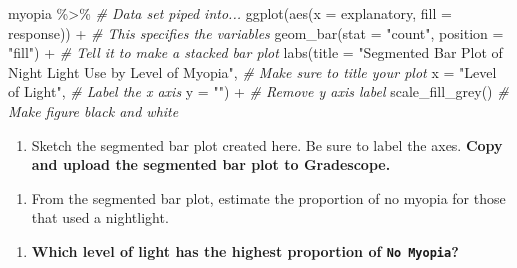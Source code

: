 \documentclass[
]{report}
\newenvironment{Shaded}{\begin{snugshade}}{\end{snugshade}}
\newcommand{\AttributeTok}[1]{\textcolor[rgb]{0.77,0.63,0.00}{#1}}
\newcommand{\CommentTok}[1]{\textcolor[rgb]{0.56,0.35,0.01}{\textit{#1}}}
\newcommand{\FunctionTok}[1]{\textcolor[rgb]{0.00,0.00,0.00}{#1}}
\newcommand{\NormalTok}[1]{#1}
\newcommand{\SpecialCharTok}[1]{\textcolor[rgb]{0.00,0.00,0.00}{#1}}
\newcommand{\StringTok}[1]{\textcolor[rgb]{0.31,0.60,0.02}{#1}}
\providecommand{\tightlist}{%
  \setlength{\itemsep}{0pt}\setlength{\parskip}{0pt}}
\begin{document}
\begin{Shaded}
\begin{Highlighting}[]
\NormalTok{myopia }\SpecialCharTok{\%\textgreater{}\%} \CommentTok{\# Data set piped into...}
\FunctionTok{ggplot}\NormalTok{(}\FunctionTok{aes}\NormalTok{(}\AttributeTok{x =}\NormalTok{ explanatory, }\AttributeTok{fill =}\NormalTok{ response)) }\SpecialCharTok{+}   \CommentTok{\# This specifies the variables}
  \FunctionTok{geom\_bar}\NormalTok{(}\AttributeTok{stat =} \StringTok{"count"}\NormalTok{, }\AttributeTok{position =} \StringTok{"fill"}\NormalTok{) }\SpecialCharTok{+}  \CommentTok{\# Tell it to make a stacked bar plot}
  \FunctionTok{labs}\NormalTok{(}\AttributeTok{title =} \StringTok{"Segmented Bar Plot of Night Light Use by Level of Myopia"}\NormalTok{,  }
       \CommentTok{\# Make sure to title your plot }
       \AttributeTok{x =} \StringTok{"Level of Light"}\NormalTok{,   }\CommentTok{\# Label the x axis}
       \AttributeTok{y =} \StringTok{""}\NormalTok{) }\SpecialCharTok{+}  \CommentTok{\# Remove y axis label}
    \FunctionTok{scale\_fill\_grey}\NormalTok{()  }\CommentTok{\# Make figure black and white}
\end{Highlighting}
\end{Shaded}

\begin{enumerate}
\def\labelenumi{\arabic{enumi}.}
\setcounter{enumi}{4}
\tightlist
\item
  Sketch the segmented bar plot created here. Be sure to label the axes. \textbf{Copy and upload the segmented bar plot to Gradescope.}
\end{enumerate}

\vspace{2in}

\begin{enumerate}
\def\labelenumi{\arabic{enumi}.}
\setcounter{enumi}{5}
\tightlist
\item
  From the segmented bar plot, estimate the proportion of no myopia for those that used a nightlight.
\end{enumerate}

\vspace{0.5in}

\begin{enumerate}
\def\labelenumi{\arabic{enumi}.}
\setcounter{enumi}{6}
\tightlist
\item
  \textbf{Which level of light has the highest proportion of \texttt{No\ Myopia}?}
\end{enumerate}
\end{document}
